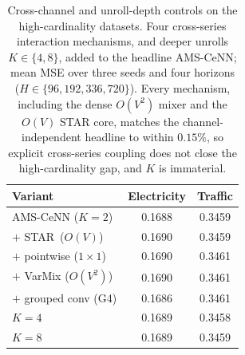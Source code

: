 \begin{table}[!htbp]
\centering
\caption{Cross-channel and unroll-depth controls on the high-cardinality datasets. Four cross-series interaction mechanisms, and deeper unrolls $K \in \{4, 8\}$, added to the headline AMS-CeNN; mean MSE over three seeds and four horizons ($H \in \{96,192,336,720\}$). Every mechanism, including the dense $O(V^2)$ mixer and the $O(V)$ STAR core, matches the channel-independent headline to within $0.15\%$, so explicit cross-series coupling does not close the high-cardinality gap, and $K$ is immaterial.}
\label{tab:crosschan}
\footnotesize
\setlength{\tabcolsep}{4pt}
\begin{tabular}{lcc}
\toprule
Variant & Electricity & Traffic \\
\midrule
AMS-CeNN ($K{=}2$) & 0.1688 & 0.3459 \\
\quad $+$ STAR \,($O(V)$) & 0.1690 & 0.3459 \\
\quad $+$ pointwise ($1{\times}1$) & 0.1690 & 0.3461 \\
\quad $+$ VarMix ($O(V^2)$) & 0.1690 & 0.3461 \\
\quad $+$ grouped conv (G4) & 0.1686 & 0.3461 \\
\quad $K{=}4$ & 0.1689 & 0.3458 \\
\quad $K{=}8$ & 0.1689 & 0.3459 \\
\bottomrule
\end{tabular}
\end{table}
